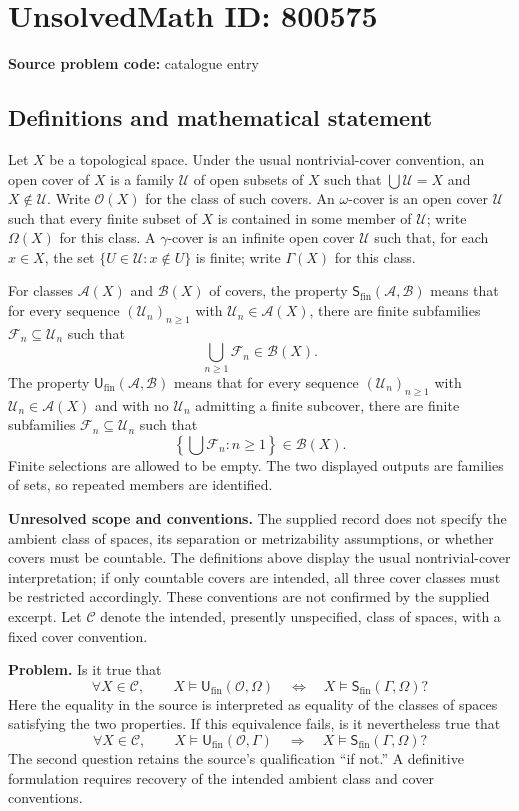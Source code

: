 \documentclass[11pt]{article}
\begin{document}
\section*{UnsolvedMath ID: 800575}
\textbf{Source problem code:} catalogue entry
\subsection{Definitions and mathematical statement}
Let \(X\) be a topological space. Under the usual nontrivial-cover convention, an open cover of \(X\) is a family \(\mathcal U\) of open subsets of \(X\) such that \(\bigcup\mathcal U=X\) and \(X\notin\mathcal U\). Write \(\mathcal O(X)\) for the class of such covers. An \(\omega\)-cover is an open cover \(\mathcal U\) such that every finite subset of \(X\) is contained in some member of \(\mathcal U\); write \(\Omega(X)\) for this class. A \(\gamma\)-cover is an infinite open cover \(\mathcal U\) such that, for each \(x\in X\), the set \(\{U\in\mathcal U:x\notin U\}\) is finite; write \(\Gamma(X)\) for this class.

For classes \(\mathcal A(X)\) and \(\mathcal B(X)\) of covers, the property \(\mathsf S_{\mathrm{fin}}(\mathcal A,\mathcal B)\) means that for every sequence \((\mathcal U_n)_{n\geq 1}\) with \(\mathcal U_n\in\mathcal A(X)\), there are finite subfamilies \(\mathcal F_n\subseteq\mathcal U_n\) such that
\[
\bigcup_{n\geq 1}\mathcal F_n\in\mathcal B(X).
\]
The property \(\mathsf U_{\mathrm{fin}}(\mathcal A,\mathcal B)\) means that for every sequence \((\mathcal U_n)_{n\geq 1}\) with \(\mathcal U_n\in\mathcal A(X)\) and with no \(\mathcal U_n\) admitting a finite subcover, there are finite subfamilies \(\mathcal F_n\subseteq\mathcal U_n\) such that
\[
\left\{\bigcup\mathcal F_n:n\geq 1\right\}\in\mathcal B(X).
\]
Finite selections are allowed to be empty. The two displayed outputs are families of sets, so repeated members are identified.

\textbf{Unresolved scope and conventions.} The supplied record does not specify the ambient class of spaces, its separation or metrizability assumptions, or whether covers must be countable. The definitions above display the usual nontrivial-cover interpretation; if only countable covers are intended, all three cover classes must be restricted accordingly. These conventions are not confirmed by the supplied excerpt. Let \(\mathscr C\) denote the intended, presently unspecified, class of spaces, with a fixed cover convention.

\textbf{Problem.} Is it true that
\[
\forall X\in\mathscr C,\qquad
X\models\mathsf U_{\mathrm{fin}}(\mathcal O,\Omega)
\quad\Longleftrightarrow\quad
X\models\mathsf S_{\mathrm{fin}}(\Gamma,\Omega)?
\]
Here the equality in the source is interpreted as equality of the classes of spaces satisfying the two properties. If this equivalence fails, is it nevertheless true that
\[
\forall X\in\mathscr C,\qquad
X\models\mathsf U_{\mathrm{fin}}(\mathcal O,\Gamma)
\quad\Longrightarrow\quad
X\models\mathsf S_{\mathrm{fin}}(\Gamma,\Omega)?
\]
The second question retains the source's qualification ``if not.'' A definitive formulation requires recovery of the intended ambient class and cover conventions.
\end{document}
